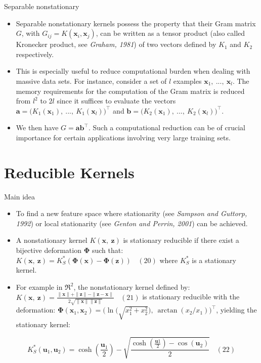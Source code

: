 \documentclass[
  ignorenonframetext,
]{beamer}
\begin{document}
\begin{frame}{Separable nonstationary}
\protect\hypertarget{separable-nonstationary}{}
\begin{itemize}
\item
  Separable nonstationary kernels possess the property that their Gram
  matrix \(G\), with \(G_{ij}=K(\pmb x_i, \pmb x_j)\), can be written as
  a tensor product (also called Kronecker product, see \emph{Graham,
  1981}) of two vectors defined by \(K_1\) and \(K_2\) respectively.
\item
  This is especially useful to reduce computational burden when dealing
  with massive data sets. For instance, consider a set of \(l\) examples
  \(\pmb x_1,\ ... ,\ \pmb x_l\). The memory requirements for the
  computation of the Gram matrix is reduced from \(l^2\) to \(2l\) since
  it suffices to evaluate the vectors
  \(\pmb a=\big(K_1(\pmb x_1),\ ...,\ K_1(\pmb x_l)\big)^{\top}\) and
  \(\pmb b=\big(K_2(\pmb x_1),\ ...,\ K_2(\pmb x_l)\big)^{\top}\).
\item
  We then have \(G = \pmb{ab}^{\top}\). Such a computational reduction
  can be of crucial importance for certain applications involving very
  large training sets.
\end{itemize}
\end{frame}

\hypertarget{reducible-kernels}{%
\section{Reducible Kernels}\label{reducible-kernels}}

\begin{frame}{Main idea}
\protect\hypertarget{main-idea}{}
\begin{itemize}
\item
  To find a new feature space where stationarity (see \emph{Sampson and
  Guttorp, 1992}) or local stationarity (see \emph{Genton and Perrin,
  2001}) can be achieved.
\item
  A nonstationary kernel \(K(\pmb x,\ \pmb z)\) is stationary reducible
  if there exist a bijective deformation \(\pmb \Phi\) such that:
  \(K(\pmb x,\ \pmb z) = K_S^*(\pmb\Phi(\pmb x) - \pmb\Phi(\pmb z))\ \ \ \ (20)\)
  where \(K_S^*\) is a stationary kernel.
\item
  For example in \(\mathfrak R^2\), the nonstationary kernel defined by:
  \(K(\pmb x,\ \pmb z) = \frac {\|\pmb x\| + \|\pmb z\| - \|\pmb z - \pmb x\|}{2 \sqrt{\|\pmb x\|\|\pmb z\|}} \ \ \ \ (21)\)
  is stationary reducible with the deformation:
  \(\pmb \Phi(\pmb x_1, \pmb x_2) = \bigg(\ln\Big(\sqrt {x^2_1+x^2_2}\Big),\ \arctan(x_2/x_1)\bigg)^{\top}\),
  yielding the stationary kernel:
\end{itemize}

\[
K_S^*(\pmb u_1, \pmb u_2) = \cosh(\frac{\pmb u_1} 2) - \sqrt{\frac {\cosh(\frac {\pmb u1} 2) - \cos(\pmb u_2)} 2} \ \ \ \ (22)
\]
\end{frame}
\end{document}
